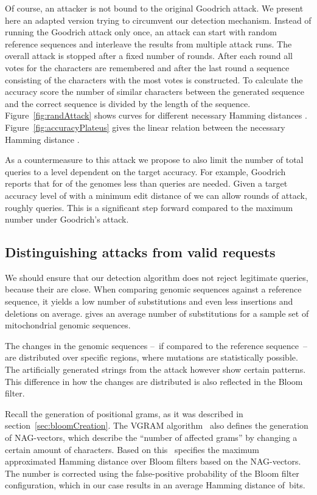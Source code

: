 \documentclass{llncs}
\begin{document}
Of course, an attacker is not bound to the original Goodrich attack.
We present here an adapted version trying to circumvent our detection mechanism.
Instead of running the Goodrich attack only once, an attack can start with
random reference sequences and interleave the results from multiple attack runs.
The overall attack is stopped after a fixed number of rounds. After each round
all votes for the characters are remembered and after the last round a sequence
consisting of the characters with the most votes is constructed. To calculate
the accuracy score the number of similar characters between the generated
sequence and the correct sequence is divided by the length of the sequence.
Figure~\ref{fig:randAttack} shows curves for different necessary Hamming
distances . Figure~\ref{fig:accuracyPlateus} gives the linear relation between the necessary Hamming
distance . 

As a countermeasure to this attack we propose to also limit the number of total queries to a level dependent on the target accuracy.
For example, Goodrich reports that for  of the genomes less than  queries are needed.
Given a target accuracy level of  with a minimum edit distance of  we can allow  rounds of attack, roughly  queries.
This is a significant step forward compared to the maximum number under Goodrich's attack.

\subsection{Distinguishing attacks from valid requests}
\label{sec:attackSeparation}

We should ensure that our detection algorithm does not reject legitimate queries, because their are close.
When comparing genomic sequences against a reference sequence, it yields a low
number of substitutions and even less insertions and deletions on average.
\cite{Goo09} gives an average number of  substitutions for a sample set of
 mitochondrial genomic sequences. 



The changes in the genomic sequences --~if compared to the reference sequence~-- are distributed over specific regions, where mutations are statistically possible.
The artificially generated strings from the attack however show certain patterns.
This difference in how the changes are distributed is also reflected in the Bloom filter.

Recall the generation of positional grams, as it was described in section~\ref{sec:bloomCreation}.
The VGRAM algorithm~\cite{Li07} also defines the generation of NAG-vectors, which describe the ``number of affected grams'' by changing a certain amount of characters.
Based on this~\cite{BecKer12} specifies the maximum approximated Hamming distance over Bloom filters based on the NAG-vectors.
The number is corrected using the false-positive probability of the Bloom filter configuration, which in our case results in an average Hamming distance of \,bits.
\end{document}
